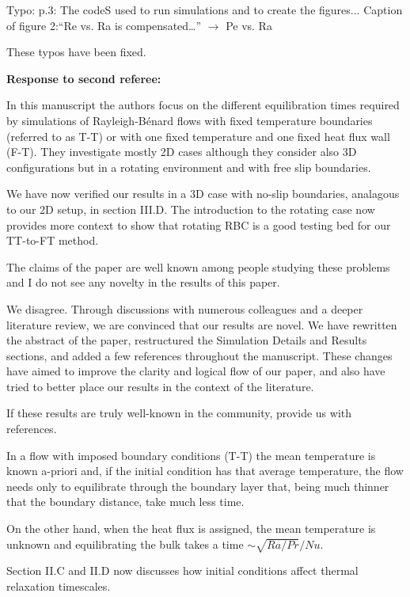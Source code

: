 \documentclass[aps, 11pt, singlecolumn]{revtex4-1} %
\begin{document}
\begin{singlespace}
\begin{myquotation}
Typo:
p.3: The codeS used to run simulations and to create the figures...
Caption of figure 2:``Re vs. Ra is compensated…'' $\rightarrow$ Pe vs. Ra
\end{myquotation}
These typos have been fixed.

\newpage
\noindent
\Large{\textbf{Response to second referee:}}\newline$\,$\newline\indent
\begin{myquotation}
In this manuscript the authors focus on the different equilibration times required by simulations of Rayleigh-B\'{e}nard flows with fixed temperature boundaries (referred to as T-T) or with one fixed temperature and one fixed heat flux wall (F-T). 
They investigate mostly 2D cases although they consider also 3D configurations but in a rotating environment and with free slip boundaries. 
\end{myquotation}
We have now verified our results in a 3D case with no-slip boundaries, analagous to our 2D setup, in section III.D.
The introduction to the rotating case now provides more context to show that rotating RBC is a good testing bed for our TT-to-FT method.

\begin{myquotation}
The claims of the paper are well known among people studying these problems and I do not see any novelty in the results of this paper. 
\end{myquotation}
We disagree.
Through discussions with numerous colleagues and a deeper literature review, we are convinced that our results are novel.
We have rewritten the abstract of the paper, restructured the Simulation Details and Results sections, and added a few references throughout the manuscript.
These changes have aimed to improve the clarity and logical flow of our paper, and also have tried to better place our results in the context of the literature.

If these results are truly well-known in the community, provide us with references.

\begin{myquotation}
In a flow with imposed boundary conditions (T-T) the mean temperature is known a-priori and, if the initial condition has that average temperature, the flow needs only to equilibrate through the boundary layer that, being much thinner that the boundary distance, take much less time.

On the other hand, when the heat flux is assigned, the mean temperature is unknown and equilibrating the bulk takes a time $\sim\sqrt{Ra/Pr}/Nu$. 
\end{myquotation}
Section II.C and II.D now discusses how initial conditions affect thermal relaxation timescales.


\end{singlespace}
\end{document}
